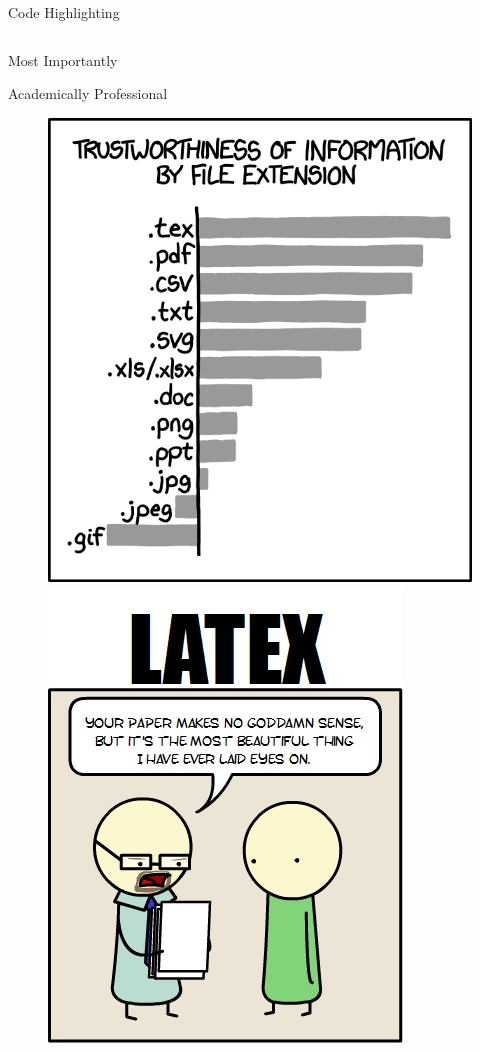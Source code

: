 \begin{frame}{\insertsection}{Code Highlighting}
	\tiny{\inputminted[numbers=none, frame=single]{matlab}{./Example_Codes/A_over_Astar_isentropic.m}}
\end{frame}

\begin{frame}{\insertsection}{}
	\centering
	\Huge{Most Importantly}
\end{frame}

\begin{frame}{\insertsection}{Academically Professional}
	\begin{figure}
		\includegraphics[height=0.7\textheight]{./Images/file_extensions_2x.png}
		\hspace{5em}
		\includegraphics[height=0.7\textheight]{./Images/latex.png}

\end{figure}
\end{frame}
